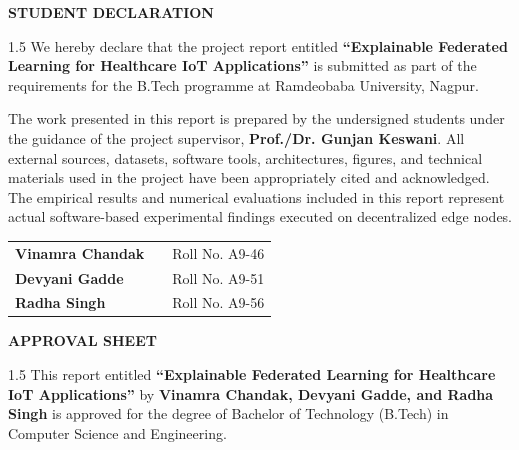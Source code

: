 \documentclass[12pt,a4paper,oneside]{report}
\begin{document}
\clearpage
\begin{center}
{\fontsize{14pt}{18pt}\bfseries\selectfont STUDENT DECLARATION}\\[2.0em]
\end{center}

\begin{spacing}{1.5}
We hereby declare that the project report entitled \textbf{``Explainable Federated Learning for Healthcare IoT Applications''} is submitted as part of the requirements for the B.Tech programme at Ramdeobaba University, Nagpur.

The work presented in this report is prepared by the undersigned students under the guidance of the project supervisor, \textbf{Prof./Dr. Gunjan Keswani}. All external sources, datasets, software tools, architectures, figures, and technical materials used in the project have been appropriately cited and acknowledged. The empirical results and numerical evaluations included in this report represent actual software-based experimental findings executed on decentralized edge nodes.
\end{spacing}

\vspace{4.0em}

\noindent
\begin{tabularx}{\textwidth}{l X r}
\textbf{Vinamra Chandak} & & Roll No. A9-46 \\[2.5em]
\textbf{Devyani Gadde} & & Roll No. A9-51 \\[2.5em]
\textbf{Radha Singh} & & Roll No. A9-56 \\
\end{tabularx}

\clearpage
\begin{center}
{\fontsize{14pt}{18pt}\bfseries\selectfont APPROVAL SHEET}\\[2.0em]
\end{center}

\begin{spacing}{1.5}
This report entitled \textbf{``Explainable Federated Learning for Healthcare IoT Applications''} by \textbf{Vinamra Chandak, Devyani Gadde, and Radha Singh} is approved for the degree of Bachelor of Technology (B.Tech) in Computer Science and Engineering.
\end{spacing}
\end{document}
